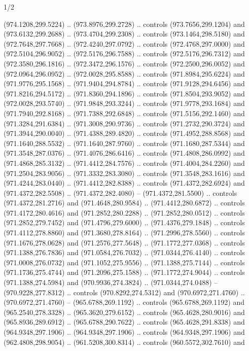 \begin{flagdescription}{1/2}
\begin{scope}[xshift=0.75\flaglength,yshift=0.5\flagwidth,scale=0.00293\flagwidth]
\begin{scope}[scale=0.675,y=0.80pt, x=0.80pt,yscale=-1,xshift=-720,yshift=-240]
\begin{scope}[miter limit=4.80]
\begin{scope}[draw=black,fill=brown,line width=0.336\lw]
  (974.1208,299.5224) .. (973.8976,299.2728) .. controls (973.7656,299.1204) and
  (973.6132,299.2688) .. (973.4704,299.2308) .. controls (973.1464,298.5180) and
  (972.7648,297.7668) .. (972.4240,297.0792) .. controls (972.4768,297.0000) and
  (972.5104,296.9052) .. (972.5176,296.7588) .. controls (972.5176,296.7312) and
  (972.3580,296.1816) .. (972.3472,296.1576) .. controls (972.2500,296.0052) and
  (972.0964,296.0952) .. (972.0028,295.8588) .. controls (971.8984,295.6224) and
  (971.9776,295.1568) .. (971.9404,294.8784) .. controls (971.9128,294.6456) and
  (971.8216,294.5172) .. (971.8360,294.1896) .. controls (971.8504,293.9052) and
  (972.0028,293.5740) .. (971.9848,293.3244) .. controls (971.9778,293.1684) and
  (971.7940,292.8168) .. (971.7388,292.6848) .. controls (971.5156,292.1460) and
  (971.3284,291.6384) .. (971.3008,290.9736) .. controls (971.2732,290.3724) and
  (971.3944,290.0040) .. (971.4388,289.4820) .. controls (971.4952,288.8568) and
  (971.1640,288.5532) .. (971.1640,287.9760) .. controls (971.1680,287.5344) and
  (971.3548,287.0376) .. (971.4076,286.6416) .. controls (971.4808,286.0992) and
  (971.4868,285.3132) .. (971.4412,284.7576) .. controls (971.4004,284.2260) and
  (971.2504,283.9056) .. (971.3332,283.3080) .. controls (971.3548,283.1616) and
  (971.4244,283.0440) .. (971.4412,282.8388) .. controls (971.4372,282.6924) and
  (971.4372,282.5508) .. (971.4372,282.4080) -- (971.4372,281.5500) .. controls
  (971.4372,281.2716) and (971.4648,280.9584) .. (971.4412,280.6872) .. controls
  (971.4172,280.4616) and (971.2852,280.2288) .. (971.2852,280.0512) .. controls
  (971.2852,279.7452) and (971.4796,279.6000) .. (971.4376,279.1848) .. controls
  (971.4112,278.8860) and (971.3680,278.8164) .. (971.2996,278.5560) .. controls
  (971.1676,278.0628) and (971.2576,277.5648) .. (971.1772,277.0368) .. controls
  (971.1388,276.7836) and (971.0584,276.7032) .. (971.0344,276.4140) .. controls
  (971.0008,276.0732) and (971.1052,275.9556) .. (971.1388,275.7144) .. controls
  (971.1736,275.4744) and (971.2096,275.1588) .. (971.1772,274.9044) .. controls
  (971.1388,274.5984) and (970.9936,274.3824) .. (971.0344,274.0488) --
  (970.9228,277.8312) .. controls (970.8292,274.5312) and (970.6972,271.4760) ..
  (970.6972,271.4760) -- (965.6788,269.1192) .. controls (965.6788,269.1192) and
  (965.2540,278.3328) .. (965.3620,279.6152) .. controls (965.4628,280.9016) and
  (965.8936,289.6912) .. (965.6788,290.7622) .. controls (965.4628,291.8338) and
  (964.9348,297.1906) .. (964.9348,297.1906) .. controls (964.9348,297.1906) and
  (962.4808,298.9054) .. (961.5208,300.8314) .. controls (960.5572,302.7610) and

\end{scope}
\end{scope}
\end{scope}
\end{scope}
\end{flagdescription}
